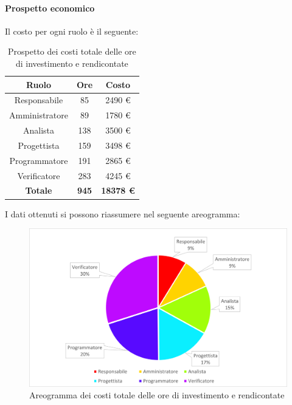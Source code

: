 \paragraph{Prospetto economico}
Il costo per ogni ruolo è il seguente:
\begin{table}[H]
		\begin{center}
			\setlength{\aboverulesep}{0pt}
			\setlength{\belowrulesep}{0pt}
			\setlength{\extrarowheight}{.75ex}
			\begin{tabular}{ c c c }
				\rowcolor{AzzurroGruppo!30} 
				\textbf{Ruolo} & \textbf{Ore} & \textbf{Costo}  \\
				\toprule
				Responsabile   & 85 & 2490 \euro \\
				Amministratore & 89 & 1780 \euro \\
				Analista       & 138 & 3500 \euro \\
				Progettista    & 159 & 3498 \euro \\
				Programmatore  & 191 & 2865 \euro \\
				Verificatore   & 283 & 4245 \euro \\
				\textbf{Totale} & \textbf{945} & \textbf{18378 \euro} \\
				\bottomrule
			\end{tabular}
			\caption{ Prospetto dei costi totale delle ore di investimento e rendicontate}
		\end{center}
	\end{table}
I dati ottenuti si possono riassumere nel seguente areogramma:
\begin{figure}[H]
    \centering
    \includegraphics[scale = 0.5]{components/img/Totale-non-rendicontate-torta.png}
    \caption{ Areogramma dei costi totale delle ore di investimento e rendicontate}
    \label{fig:Areogramma ripartizione ore totali di investimento e rendicontate}
\end{figure}
